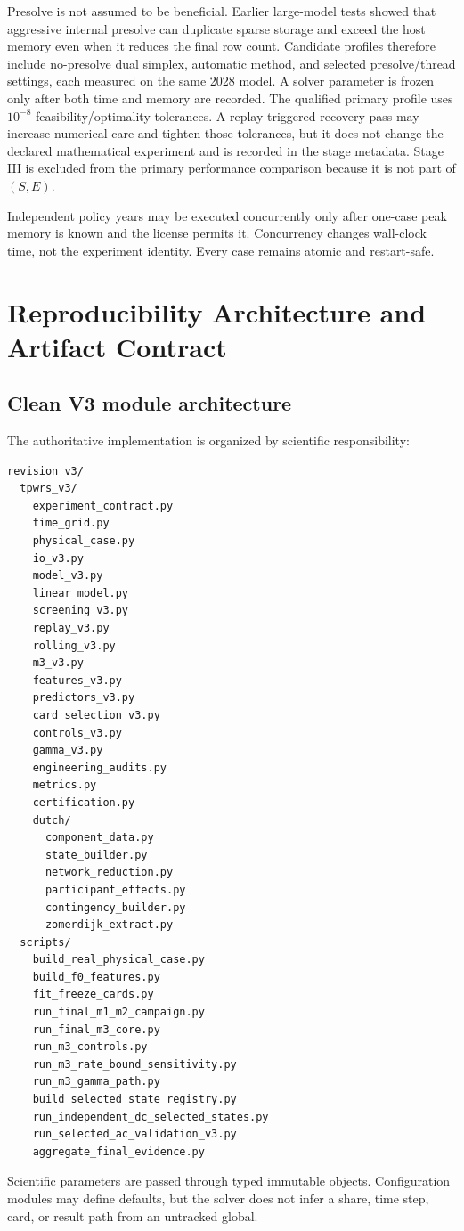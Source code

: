 \documentclass[10pt,journal,onecolumn]{IEEEtran}
\begin{document}
Presolve is not assumed to be beneficial. Earlier large-model tests showed that
aggressive internal presolve can duplicate sparse storage and exceed the host
memory even when it reduces the final row count. Candidate profiles therefore
include no-presolve dual simplex, automatic method, and selected presolve/thread
settings, each measured on the same 2028 model. A solver parameter is frozen only after both time and memory are recorded. The qualified primary profile uses $10^{-8}$ feasibility/optimality tolerances. A replay-triggered recovery pass may increase numerical care and tighten those tolerances, but it does not change the declared mathematical experiment and is recorded in the stage metadata. Stage III is excluded from the primary performance comparison because it is not part of $(S,E)$.

Independent policy years may be executed concurrently only after one-case peak
memory is known and the license permits it. Concurrency changes wall-clock time,
not the experiment identity. Every case remains atomic and restart-safe.

\section{Reproducibility Architecture and Artifact Contract}
\label{sec:report_reproducibility}

\subsection{Clean V3 module architecture}

The authoritative implementation is organized by scientific responsibility:
\begin{verbatim}
revision_v3/
  tpwrs_v3/
    experiment_contract.py
    time_grid.py
    physical_case.py
    io_v3.py
    model_v3.py
    linear_model.py
    screening_v3.py
    replay_v3.py
    rolling_v3.py
    m3_v3.py
    features_v3.py
    predictors_v3.py
    card_selection_v3.py
    controls_v3.py
    gamma_v3.py
    engineering_audits.py
    metrics.py
    certification.py
    dutch/
      component_data.py
      state_builder.py
      network_reduction.py
      participant_effects.py
      contingency_builder.py
      zomerdijk_extract.py
  scripts/
    build_real_physical_case.py
    build_f0_features.py
    fit_freeze_cards.py
    run_final_m1_m2_campaign.py
    run_final_m3_core.py
    run_m3_controls.py
    run_m3_rate_bound_sensitivity.py
    run_m3_gamma_path.py
    build_selected_state_registry.py
    run_independent_dc_selected_states.py
    run_selected_ac_validation_v3.py
    aggregate_final_evidence.py
\end{verbatim}
Scientific parameters are passed through typed immutable objects. Configuration
modules may define defaults, but the solver does not infer a share, time step,
card, or result path from an untracked global.
\end{document}
